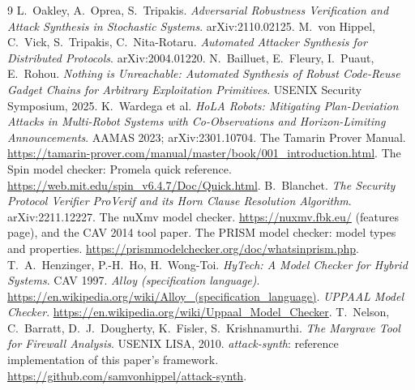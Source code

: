 \documentclass[11pt]{amsart}
\theoremstyle{definition}
\theoremstyle{remark}
\begin{document}
\begin{thebibliography}{9}
 L.\ Oakley, A.\ Oprea, S.\ Tripakis. \emph{Adversarial Robustness Verification and Attack Synthesis in Stochastic Systems}. arXiv:2110.02125.
 M.\ von Hippel, C.\ Vick, S.\ Tripakis, C.\ Nita-Rotaru. \emph{Automated Attacker Synthesis for Distributed Protocols}. arXiv:2004.01220.
 N.\ Bailluet, E.\ Fleury, I.\ Puaut, E.\ Rohou. \emph{Nothing is Unreachable: Automated Synthesis of Robust Code-Reuse Gadget Chains for Arbitrary Exploitation Primitives}. USENIX Security Symposium, 2025.
 K.\ Wardega et al. \emph{HoLA Robots: Mitigating Plan-Deviation Attacks in Multi-Robot Systems with Co-Observations and Horizon-Limiting Announcements}. AAMAS 2023; arXiv:2301.10704.
 The Tamarin Prover Manual. \url{https://tamarin-prover.com/manual/master/book/001_introduction.html}.
 The Spin model checker: Promela quick reference. \url{https://web.mit.edu/spin_v6.4.7/Doc/Quick.html}.
 B.\ Blanchet. \emph{The Security Protocol Verifier ProVerif and its Horn Clause Resolution Algorithm}. arXiv:2211.12227.
 The nuXmv model checker. \url{https://nuxmv.fbk.eu/} (features page), and the CAV 2014 tool paper.
 The PRISM model checker: model types and properties. \url{https://prismmodelchecker.org/doc/whatsinprism.php}.
 T.\ A.\ Henzinger, P.-H.\ Ho, H.\ Wong-Toi. \emph{HyTech: A Model Checker for Hybrid Systems}. CAV 1997.
 \emph{Alloy (specification language)}. \url{https://en.wikipedia.org/wiki/Alloy_(specification_language)}.
 \emph{UPPAAL Model Checker}. \url{https://en.wikipedia.org/wiki/Uppaal_Model_Checker}.
 T.\ Nelson, C.\ Barratt, D.\ J.\ Dougherty, K.\ Fisler, S.\ Krishnamurthi. \emph{The Margrave Tool for Firewall Analysis}. USENIX LISA, 2010.
 \emph{attack-synth}: reference implementation of this paper's framework. \url{https://github.com/samvonhippel/attack-synth}.
\end{thebibliography}
\end{document}
